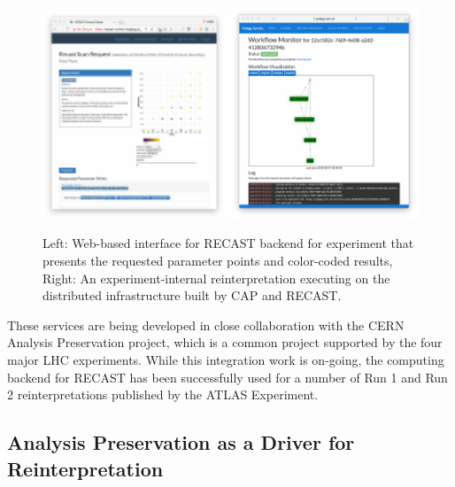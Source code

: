 \begin{figure}[t]
\begin{center}
\includegraphics[width=0.5\textwidth,angle=0]{ch5-figures/requestview.pdf}\includegraphics[width=0.5\textwidth,angle=0]{ch5-figures/monitor.pdf}

\end{center}
\caption{
Left: Web-based interface for RECAST backend for experiment that presents the requested parameter points and color-coded results,
Right: An experiment-internal reinterpretation executing on the distributed infrastructure built by CAP and RECAST.}
\label{fig:recast-cc}
\end{figure}

These services are being developed in close collaboration with the CERN Analysis Preservation project, which is a common project supported by the four major LHC experiments. While this integration work is on-going, the computing backend for RECAST has been successfully used for a number of Run 1 and Run 2 reinterpretations published by the ATLAS Experiment.

\subsection{Analysis Preservation as a Driver for Reinterpretation}

